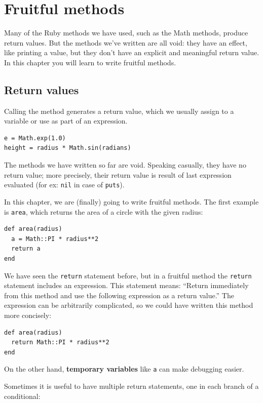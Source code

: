 \documentclass[10pt]{book}
\begin{document}
\chapter{Fruitful methods}
\label{fruitchap}

Many of the Ruby methods we have used, such as the Math
methods, produce return values.  But the methods we've written
are all void: they have an effect, like printing a value,
but they don't have an explicit and meaningful return value.  In
this chapter you will learn to write fruitful methods.


\section{Return values}

Calling the method generates a return
value, which we usually assign to a variable or use as part of an
expression.

\begin{verbatim}
e = Math.exp(1.0)
height = radius * Math.sin(radians)
\end{verbatim}
%
The methods we have written so far are void.  Speaking casually,
they have no return value; more precisely,
their return value is result of last expression evaluated (for ex:
{\tt nil} in case of {\tt puts}).

In this chapter, we are (finally) going to write fruitful methods.
The first example is {\tt area}, which returns the area of a circle
with the given radius:

\begin{verbatim}
def area(radius)
  a = Math::PI * radius**2
  return a
end
\end{verbatim}
%
We have seen the {\tt return} statement before, but in a fruitful
method the {\tt return} statement includes
an expression.  This statement means: ``Return immediately from
this method and use the following expression as a return value.''
The expression can be arbitrarily complicated, so we could
have written this method more concisely:

\begin{verbatim}
def area(radius)
  return Math::PI * radius**2
end
\end{verbatim}
%
On the other hand, {\bf temporary variables} like {\tt a} can make
debugging easier.

Sometimes it is useful to have multiple return statements, one in each
branch of a conditional:
\end{document}
